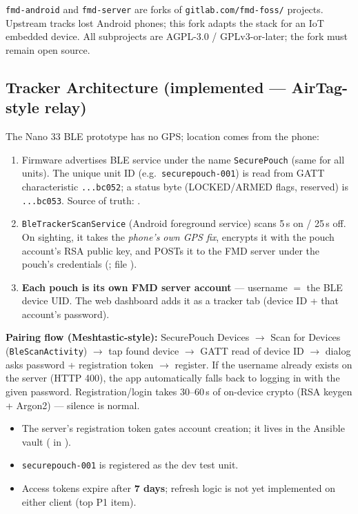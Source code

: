\documentclass[11pt,a4paper]{article}
\newcommand{\partno}[1]{\texttt{#1}}
\begin{document}
\texttt{fmd-android} and \texttt{fmd-server} are forks of \texttt{gitlab.com/fmd-foss/} projects. Upstream tracks lost Android phones; this fork adapts the stack for an IoT embedded device. All subprojects are AGPL-3.0 / GPLv3-or-later; the fork must remain open source.

\subsection{Tracker Architecture (implemented --- AirTag-style relay)}

The Nano 33 BLE prototype has no GPS; location comes from the phone:

\begin{enumerate}
  \item Firmware advertises BLE service  under the name \texttt{SecurePouch} (same for all units). The unique unit ID (e.g.\ \texttt{securepouch-001}) is read from GATT characteristic \partno{...bc052}; a status byte (LOCKED/ARMED flags, reserved) is \partno{...bc053}. Source of truth: .
  \item \texttt{BleTrackerScanService} (Android foreground service) scans 5\,s on / 25\,s off. On sighting, it takes the \emph{phone's own GPS fix}, encrypts it with the pouch account's RSA public key, and POSTs it to the FMD server under the pouch's credentials (;  file ).
  \item \textbf{Each pouch is its own FMD server account} --- username $=$ the BLE device UID. The web dashboard adds it as a tracker tab (device ID + that account's password).
\end{enumerate}

\textbf{Pairing flow (Meshtastic-style):} SecurePouch Devices $\rightarrow$ Scan for Devices (\texttt{BleScanActivity}) $\rightarrow$ tap found device $\rightarrow$ GATT read of device ID $\rightarrow$ dialog asks password + registration token $\rightarrow$ register. If the username already exists on the server (HTTP 400), the app automatically falls back to logging in with the given password. Registration/login takes 30--60\,s of on-device crypto (RSA keygen + Argon2) --- silence is normal.

\begin{itemize}
  \item The server's registration token gates account creation; it lives in the Ansible vault ( in ).
  \item \texttt{securepouch-001} is registered as the dev test unit.
  \item Access tokens expire after \textbf{7 days}; refresh logic is not yet implemented on either client (top P1 item).
\end{itemize}
\end{document}
